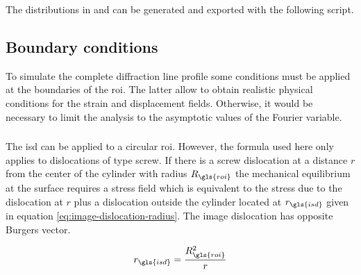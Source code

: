 %
%

\bigskip \bigskip

The distributions in  and  can be generated and exported with the following script.

\medskip


\newpage

\subsection{Boundary conditions}

To simulate the complete diffraction line profile some conditions must be applied at the boundaries of the \gls{roi}.
The latter allow to obtain realistic physical conditions for the strain and displacement fields.
Otherwise, it would be necessary to limit the analysis to the asymptotic values of the Fourier variable.

\subsubsection{}

The \gls{isd} can be applied to a circular \gls{roi}.
However, the formula used here only applies to dislocations of type screw.
If there is a screw dislocation at a distance \( r \) from the center of the cylinder with radius \( R_{\gls{roi}} \) the mechanical equilibrium at the surface requires a stress field which is equivalent to the stress due to the dislocation at \( r \) plus a dislocation outside the cylinder located at \( r_{\gls{isd}} \) given in equation \eqref{eq:image-dislocation-radius}.
The image dislocation has opposite Burgers vector.

\begin{equation}\label{eq:image-dislocation-radius}
  r_{\gls{isd}} =
    \frac{R^2_{\gls{roi}}}{r}
\end{equation}

%
%

\bigskip \bigskip

